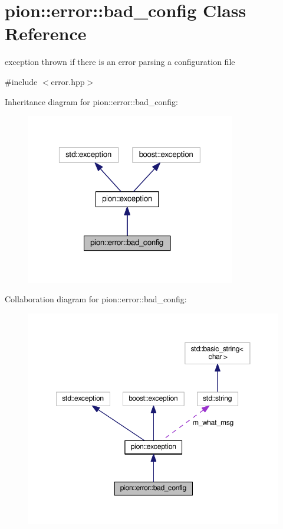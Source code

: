 \hypertarget{classpion_1_1error_1_1bad__config}{\section{pion\-:\-:error\-:\-:bad\-\_\-config Class Reference}
\label{classpion_1_1error_1_1bad__config}
}


exception thrown if there is an error parsing a configuration file  




{\ttfamily \#include $<$error.\-hpp$>$}



Inheritance diagram for pion\-:\-:error\-:\-:bad\-\_\-config\-:
\nopagebreak
\begin{figure}[H]
\begin{center}
\leavevmode
\includegraphics[width=259pt]{classpion_1_1error_1_1bad__config__inherit__graph}
\end{center}
\end{figure}


Collaboration diagram for pion\-:\-:error\-:\-:bad\-\_\-config\-:
\nopagebreak
\begin{figure}[H]
\begin{center}
\leavevmode
\includegraphics[width=350pt]{classpion_1_1error_1_1bad__config__coll__graph}
\end{center}
\end{figure}
